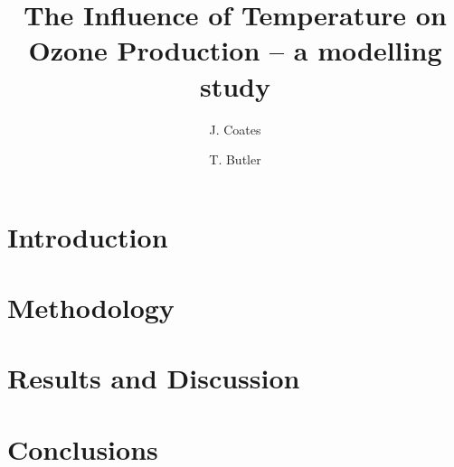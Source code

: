 \documentclass[11pt,a4paper]{article}
\title{The Influence of Temperature on Ozone Production -- a modelling study}
\author[1]{J. Coates}
\author[1]{T. Butler}
\affil[1]{Institute for Advanced Sustainability Studies, Potsdam, Germany}
\begin{document}
\maketitle

\begin{abstract}
\end{abstract}

\section{Introduction} \label{s:introduction}


\section{Methodology} \label{s:methodology}


\section{Results and Discussion} \label{s:results}


\section{Conclusions} \label{s:conclusions}
%


 
\end{document}
